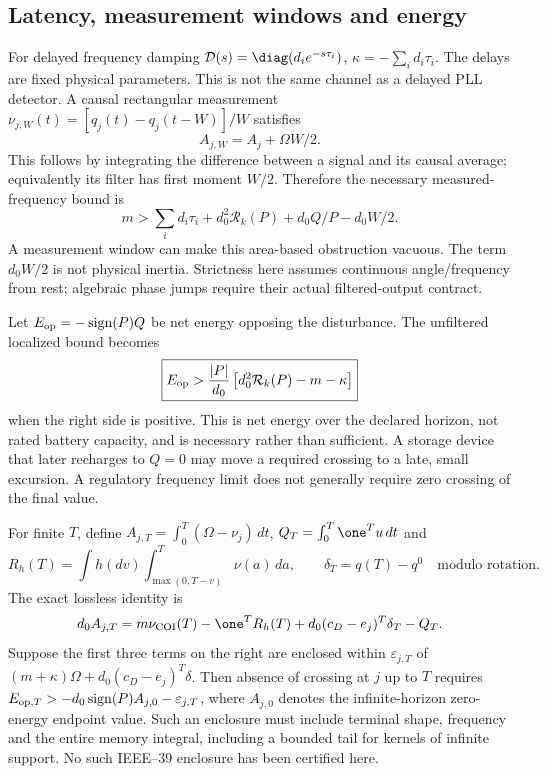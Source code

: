 \subsection{Latency, measurement windows and energy}
For delayed frequency damping
$\mathcal D(s)=\diag(d_i e^{-s\tau_i})$,
$\kappa=-\sum_i d_i\tau_i$. The delays are fixed physical parameters.
This is not the same channel as a delayed PLL detector.
A causal rectangular measurement
$\nu_{j,W}(t)=[q_j(t)-q_j(t-W)]/W$ satisfies
\begin{equation}
 A_{j,W}=A_j+\Omega W/2.
 \label{eq:nfl-window}
\end{equation}
This follows by integrating the difference between a signal and its
causal average; equivalently its filter has first moment $W/2$.
Therefore the necessary measured-frequency bound is
\begin{equation}
 \boxed{m>\sum_i d_i\tau_i+d_0^2\mathcal R_k(P)
                        +d_0Q/P-d_0W/2.}
 \label{eq:nfl-delay-window}
\end{equation}
A measurement window can make this area-based obstruction vacuous.
The term $d_0W/2$ is not physical inertia. Strictness here assumes
continuous angle/frequency from rest; algebraic phase jumps require their
actual filtered-output contract.

Let $E_{\rm op}=-\operatorname{sign}(P)Q$ be net energy opposing the
disturbance. The unfiltered localized bound becomes
\begin{equation}
 \boxed{E_{\rm op}>
     \frac{|P|}{d_0}\left[d_0^2\mathcal R_k(P)-m-\kappa\right]}
 \label{eq:nfl-energy}
\end{equation}
when the right side is positive. This is net energy over the declared
horizon, not rated battery capacity, and is necessary rather than sufficient.
A storage device that later recharges to $Q=0$ may move a required crossing
to a late, small excursion. A regulatory frequency limit does not generally
require zero crossing of the final value.

For finite $T$, define
$A_{j,T}=\int_0^T(\Omega-\nu_j)\,dt$,
$Q_T=\int_0^T\one^Tu\,dt$ and
\[
 R_h(T)=\int h(dv)\int_{\max(0,T-v)}^T\nu(a)\,da,\qquad
 \delta_T=q(T)-q^0\quad\text{modulo rotation}.
\]
The exact lossless identity is
\begin{equation}
 d_0A_{j,T}=m\nu_{\rm COI}(T)-\one^TR_h(T)
                   +d_0(c_D-e_j)^T\delta_T-Q_T.
 \label{eq:nfl-finite}
\end{equation}
Suppose the first three terms on the right are enclosed within
$\varepsilon_{j,T}$ of
$(m+\kappa)\Omega+d_0(c_D-e_j)^T\delta$.
Then absence of crossing at $j$ up to $T$ requires
$E_{{\rm op},T}>-d_0\operatorname{sign}(P)A_{j,0}
 -\varepsilon_{j,T}$, where $A_{j,0}$ denotes the infinite-horizon
zero-energy endpoint value. Such an enclosure must include terminal shape,
frequency and the entire memory integral, including a bounded tail for
kernels of infinite support. No such IEEE--39 enclosure
has been certified here.

